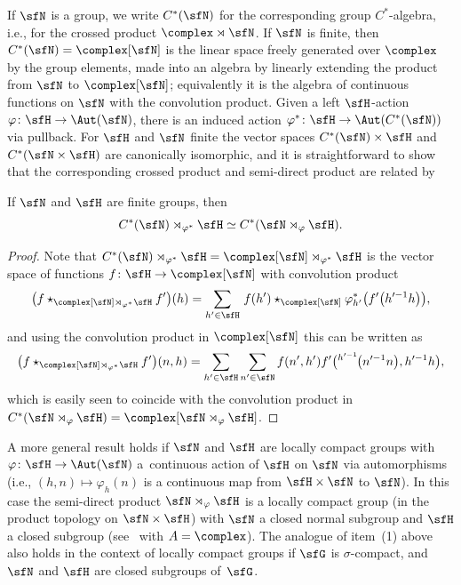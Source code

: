 If $\sfN $ is a group, we write $C^*(\sfN )$ for the corresponding group
$C^*$-algebra, i.e., for the crossed product $\complex\rtimes \sfN $. If
$\sfN $ is finite, then $C^*(\sfN )=\complex[\sfN ]$ is the linear space
freely generated over $\complex$ by the group elements, made into an algebra by
linearly extending the product from $\sfN $ to $\complex[\sfN ]$; equivalently
it is the algebra of continuous functions
on $\sfN $ with the convolution product.
 Given a
left $\sfH $-action $\varphi\colon \sfH \to\Aut(\sfN )$, there is an induced action
$\varphi^*\colon \sfH \to \Aut(C^*(\sfN ))$ via pullback. For $\sfH $ and $\sfN $ finite the
vector spaces $ C^*(\sfN )\times \sfH $ and $C^*(\sfN \times \sfH )$ are canonically
isomorphic, and it is straightforward
to show that the corresponding crossed product and semi-direct product are
related by
\begin{Proposition}\label{cpsp}
If $\sfN$ and $\sfH$ are finite groups, then
\[
C^*(\sfN )\rtimes_{\varphi^*}\sfH \simeq C^*(\sfN \rtimes_\varphi \sfH ) .
\]
\end{Proposition}
\begin{proof} Note that $C^*(\sfN )\rtimes_{\varphi^*}\sfH =\complex[\sfN ]\rtimes_{\varphi^*}\sfH $ is the
 vector space of functions $f\colon \sfH \to \complex[\sfN ]$ with convolution product
\[
\big(f\star_{\complex[\sfN ]\rtimes_{\varphi^*}\sfH } f'\big)(h)=\sum_{h'\in
 \sfH }\,f(h')\star_{\complex[\sfN ]}\varphi^*_{h'}\big(f'\big(h'^{-1} h\big)\big) ,
\]
and using the convolution product in $\complex[\sfN]$ this can be
written as
\[
\big(f\star_{\complex[\sfN ]\rtimes_{\varphi^*}\sfH }
f'\big)(n,h)=\sum_{h'\in \sfH} \sum_{n'\in
 \sfN } f(n',h') f'\big({}^{h'^{-1\!}}\big(n'^{-1} n\big),h'^{-1} h\big) ,
\]
which is easily seen
 to coincide with the convolution product in $ C^*(\sfN \rtimes_\varphi \sfH )=\complex[\sfN \rtimes_\varphi \sfH ]$.
\end{proof}

A more general result holds if $\sfN $ and $\sfH $ are locally compact groups with $\varphi\colon \sfH \to \Aut (\sfN )$
a~continuous action of $\sfH $ on $\sfN $ via automorphisms
(i.e., $(h,n)\mapsto \varphi_h(n)$ is a continuous map from $\sfH \times \sfN $ to $\sfN $).
In this case the semi-direct product $\sfN \rtimes_\varphi \sfH $ is a locally compact
group (in the product topology on $\sfN \times \sfH $) with $\sfN $ a closed normal subgroup and $\sfH $ a closed
subgroup (see~\cite[Proposition~3.11]{Williams2007} with
$A=\complex$). The analogue of item~(1) above also holds in the
context of locally compact groups if $\sfG$ is $\sigma$-compact, and
$\sfN$ and $\sfH$ are closed subgroups of~$\sfG$.

